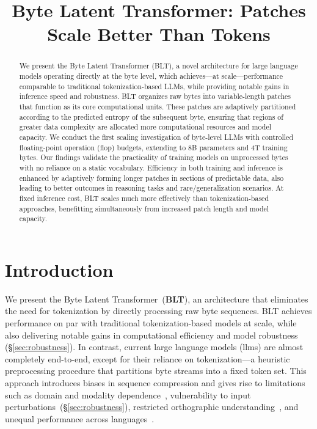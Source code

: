 \title{Byte Latent Transformer: Patches Scale Better Than Tokens}

\begin{abstract}
We present the Byte Latent Transformer ({\textsc BLT}), a novel architecture for large language models operating directly at the byte level, which achieves—at scale—performance comparable to traditional tokenization-based LLMs, while providing notable gains in inference speed and robustness. {\textsc BLT} organizes raw bytes into variable-length patches that function as its core computational units. These patches are adaptively partitioned according to the predicted entropy of the subsequent byte, ensuring that regions of greater data complexity are allocated more computational resources and model capacity. We conduct the first scaling investigation of byte-level LLMs with controlled floating-point operation (flop) budgets, extending to 8B parameters and 4T training bytes. Our findings validate the practicality of training models on unprocessed bytes with no reliance on a static vocabulary. Efficiency in both training and inference is enhanced by adaptively forming longer patches in sections of predictable data, also leading to better outcomes in reasoning tasks and rare/generalization scenarios. At fixed inference cost, {\textsc BLT} scales much more effectively than tokenization-based approaches, benefitting simultaneously from increased patch length and model capacity.
\end{abstract}

\section{Introduction}
\label{section:intro}

We present the Byte Latent Transformer~(\textbf{BLT}), an architecture that eliminates the need for tokenization by directly processing raw byte sequences. BLT achieves performance on par with traditional tokenization-based models at scale, while also delivering notable gains in computational efficiency and model robustness (\S\ref{sec:robustness}). In contrast, current large language models (llms) are almost completely end-to-end, except for their reliance on tokenization—a heuristic preprocessing procedure that partitions byte streams into a fixed token set. This approach introduces biases in sequence compression and gives rise to limitations such as domain and modality dependence~\citep{dagangetting}, vulnerability to input perturbations~(\S\ref{sec:robustness}), restricted orthographic understanding~\citep{edman2024cute}, and unequal performance across languages~\citep{liang2023xlm,petrov2024language,limisiewicz2024myte}.

